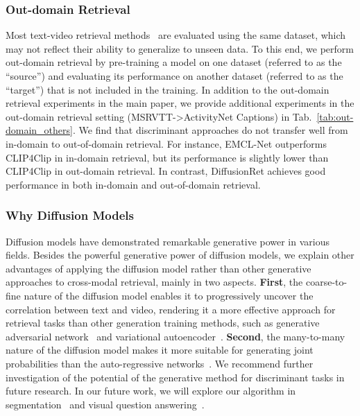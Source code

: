 \documentclass[10pt,twocolumn,letterpaper]{article}
\begin{document}
{\subsubsection{Out-domain Retrieval}\label{appendix:out-domain}
Most text-video retrieval methods~\cite{luo2021clip4clip,jin2022expectation,jin2022video,jin2023text} are evaluated using the same dataset, which may not reflect their ability to generalize to unseen data. To this end, we perform out-domain retrieval by pre-training a model on one dataset (referred to as the ``source'') and evaluating its performance on another dataset (referred to as the ``target'') that is not included in the training. In addition to the out-domain retrieval experiments in the main paper, we provide additional experiments in the out-domain retrieval setting (MSRVTT-\textgreater{}ActivityNet Captions) in Tab.~\ref{tab:out-domain_others}. We find that discriminant approaches do not transfer well from in-domain to out-of-domain retrieval. For instance, EMCL-Net outperforms CLIP4Clip in in-domain retrieval, but its performance is slightly lower than CLIP4Clip in out-domain retrieval. In contrast, DiffusionRet achieves good performance in both in-domain and out-of-domain retrieval.

\subsubsection{Why Diffusion Models}\label{why_diffusion}
Diffusion models have demonstrated remarkable generative power in various fields. Besides the powerful generative power of diffusion models, we explain other advantages of applying the diffusion model rather than other generative approaches to cross-modal retrieval, mainly in two aspects. \textbf{First}, the coarse-to-fine nature of the diffusion model enables it to progressively uncover the correlation between text and video, rendering it a more effective approach for retrieval tasks than other generation training methods, such as generative adversarial network~\cite{goodfellow2020generative} and variational autoencoder~\cite{kingma2013auto}. \textbf{Second}, the many-to-many nature of the diffusion model makes it more suitable for generating joint probabilities than the auto-regressive networks~\cite{frey1995does,radford2018improving}. We recommend further investigation of the potential of the generative method for discriminant tasks in future research. In our future work, we will explore our algorithm in segmentation~\cite{li2022dynamic,li2023multi} and visual question answering~\cite{li2022joint,li2023weakly,li2023tg}.


}
\end{document}
